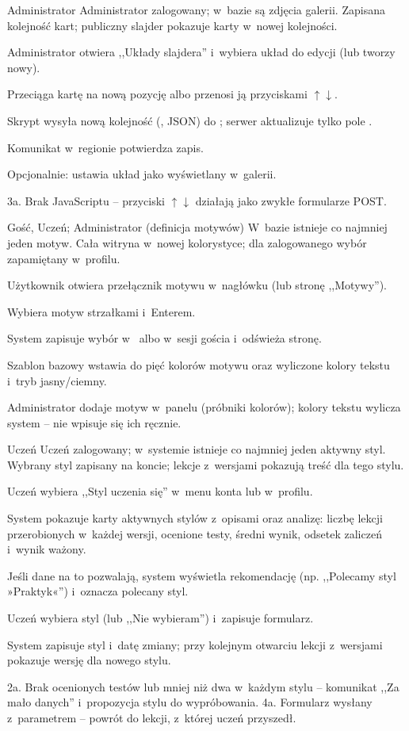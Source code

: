 {Administrator}
{Administrator zalogowany; w~bazie są zdjęcia galerii.}
{Zapisana kolejność kart; publiczny slajder pokazuje karty w~nowej kolejności.}
{\item Administrator otwiera ,,Układy slajdera'' i~wybiera układ do edycji (lub tworzy nowy).
 \item Przeciąga kartę na nową pozycję albo przenosi ją przyciskami $\uparrow\downarrow$.
 \item Skrypt wysyła nową kolejność (, JSON) do ; serwer aktualizuje tylko pole .
 \item Komunikat w~regionie  potwierdza zapis.
 \item Opcjonalnie: ustawia układ jako wyświetlany w~galerii.}
{3a. Brak JavaScriptu -- przyciski $\uparrow\downarrow$ działają jako zwykłe formularze POST.}

{Gość, Uczeń; Administrator (definicja motywów)}
{W~bazie istnieje co najmniej jeden motyw.}
{Cała witryna w~nowej kolorystyce; dla zalogowanego wybór zapamiętany w~profilu.}
{\item Użytkownik otwiera przełącznik motywu w~nagłówku (lub stronę ,,Motywy'').
 \item Wybiera motyw strzałkami i~Enterem.
 \item System zapisuje wybór w~ albo w~sesji gościa i~odświeża stronę.
 \item Szablon bazowy wstawia do  pięć kolorów motywu oraz wyliczone kolory tekstu i~tryb jasny/ciemny.}
{Administrator dodaje motyw w~panelu (próbniki kolorów); kolory tekstu wylicza system -- nie wpisuje się ich ręcznie.}

{Uczeń}
{Uczeń zalogowany; w~systemie istnieje co najmniej jeden aktywny styl.}
{Wybrany styl zapisany na koncie; lekcje z~wersjami pokazują treść dla tego stylu.}
{\item Uczeń wybiera ,,Styl uczenia się'' w~menu konta lub w~profilu.
 \item System pokazuje karty aktywnych stylów z~opisami oraz analizę: liczbę lekcji przerobionych w~każdej wersji, ocenione testy, średni wynik, odsetek zaliczeń i~wynik ważony.
 \item Jeśli dane na to pozwalają, system wyświetla rekomendację (np. ,,Polecamy styl »Praktyk«'') i~oznacza polecany styl.
 \item Uczeń wybiera styl (lub ,,Nie wybieram'') i~zapisuje formularz.
 \item System zapisuje styl i~datę zmiany; przy kolejnym otwarciu lekcji z~wersjami pokazuje wersję dla nowego stylu.}
{2a. Brak ocenionych testów lub mniej niż dwa w~każdym stylu -- komunikat ,,Za mało danych'' i~propozycja stylu do wypróbowania.\newline
4a. Formularz wysłany z~parametrem  -- powrót do lekcji, z~której uczeń przyszedł.}

